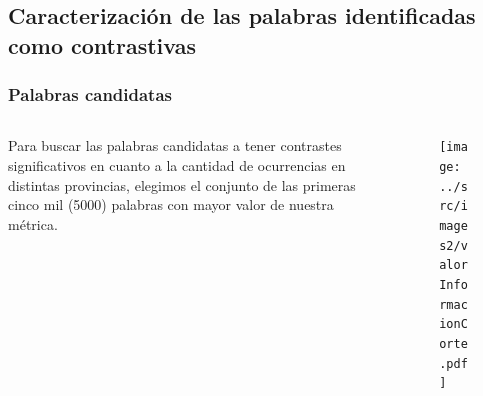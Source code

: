 \subsection{Caracterización de las palabras identificadas como contrastivas}

\begin{frame}[t]\frametitle{Palabras candidatas}

    \begin{columns}
        \begin{column}{.5\textwidth}
        Para buscar las palabras candidatas a tener contrastes significativos en cuanto a la cantidad de ocurrencias en distintas provincias, elegimos el conjunto de las primeras 
        cinco mil (5000) palabras con mayor valor de nuestra métrica.

        \end{column}

        \begin{column}{.45\textwidth}
            \begin{figure}
            \centering
            \texttt{[image: ../src/images2/valorInformacionCorte.pdf]}
            \label{fig:ivalue}
            \end{figure}
        \end{column}
    \end{columns}

\end{frame}

